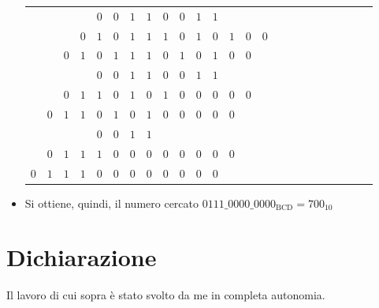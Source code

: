 \documentclass[a4paper]{extarticle}
\begin{document}
\begin{itemize}
\begin{table}[H]
\begin{tabular}{|cccc|cccc|cccc|cccccccccccc}
            &&&&\cellcolor{cyan!25!white}$0$\cellcolor{cyan!25!white}&\cellcolor{cyan!25!white}$0$&\cellcolor{cyan!25!white}$1$&\cellcolor{cyan!25!white}$1$&\cellcolor{cyan!25!white}$0$\cellcolor{cyan!25!white}&\cellcolor{cyan!25!white}$0$&\cellcolor{cyan!25!white}$1$&\cellcolor{cyan!25!white}$1$&&&&&&&&&&&&\\
    
            &&&$0$&$1$&$0$&$1$&$1$&$1$&$0$&$1$&$0$&$1$&$0$&$0$&&&&&&&&&\\
            &&$0$&$1$&\cellcolor{cyan!25!white}$0$&\cellcolor{cyan!25!white}$1$&\cellcolor{cyan!25!white}$1$&\cellcolor{cyan!25!white}$1$&\cellcolor{cyan!25!white}$0$&\cellcolor{cyan!25!white}$1$&\cellcolor{cyan!25!white}$0$&\cellcolor{cyan!25!white}$1$&$0$&$0$&&&&&&&&&&\\
    
            &&&&\cellcolor{cyan!25!white}$0$\cellcolor{cyan!25!white}&\cellcolor{cyan!25!white}$0$&\cellcolor{cyan!25!white}$1$&\cellcolor{cyan!25!white}$1$&\cellcolor{cyan!25!white}$0$\cellcolor{cyan!25!white}&\cellcolor{cyan!25!white}$0$&\cellcolor{cyan!25!white}$1$&\cellcolor{cyan!25!white}$1$&&&&&&&&&&&&\\
    
            &&$0$&$1$&$1$&$0$&$1$&$0$&$1$&$0$&$0$&$0$&$0$&$0$&&&&&&&&&&\\
            &$0$&$1$&$1$&\cellcolor{cyan!25!white}$0$&\cellcolor{cyan!25!white}$1$&\cellcolor{cyan!25!white}$0$&\cellcolor{cyan!25!white}$1$&$0$&$0$&$0$&$0$&$0$&&&&&&&&&&&\\
            &&&&\cellcolor{cyan!25!white}$0$\cellcolor{cyan!25!white}&\cellcolor{cyan!25!white}$0$&\cellcolor{cyan!25!white}$1$&\cellcolor{cyan!25!white}$1$&&&&&&&&&&&&&&&&\\
            &$0$&$1$&$1$&$1$&$0$&$0$&$0$&$0$&$0$&$0$&$0$&$0$&&&&&&&&&&\\
            $0$&$1$&$1$&$1$&$0$&$0$&$0$&$0$&$0$&$0$&$0$&$0$&&&&&&&&&&&\\
            
        \end{tabular}
        \end{table}

        \item Si ottiene, quindi, il numero cercato $0111\_0000\_0000_{\text{BCD}} = 700_{10}$
    \end{itemize}

\noindent
\section{Dichiarazione}
Il lavoro di cui sopra è stato svolto da me in completa autonomia.
\end{document}
